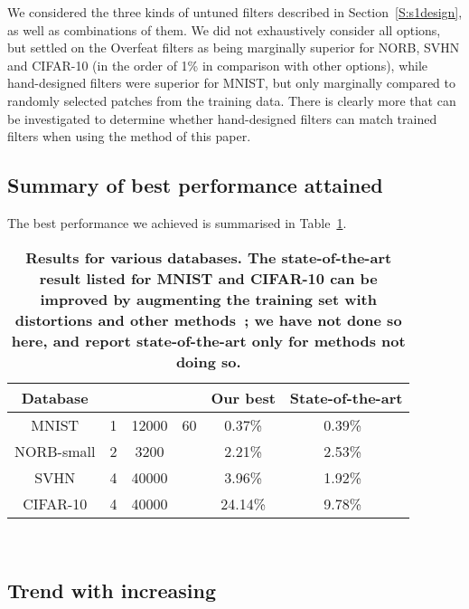 \documentclass[conference]{IEEEtran}
\begin{document}
We considered the three kinds of untuned filters described in Section~\ref{S:s1design}, as well as combinations of them. We did not exhaustively consider all options, but settled on the Overfeat filters as being marginally superior for NORB, SVHN and CIFAR-10 (in the order of 1\% in comparison with other options), while hand-designed filters were superior for MNIST, but only marginally compared to randomly selected patches from the training data. There is clearly more that can be investigated to determine whether hand-designed filters can match trained filters when using the method of this paper.

\subsection{Summary of best performance attained}

The best performance we achieved is summarised in Table~\ref{Table4}. 

\begin{table}[!ht]
{\footnotesize
\begin{tabular}{|c|c|c|c|c|c|}
\hline
Database  &  &  & & Our best & State-of-the-art\\
\hline
MNIST & 1& 12000  & 60 & 0.37\% & 0.39\%~\cite{Mairal.14,Lee.14}\\
NORB-small & 2&  3200 &  & 2.21\% & 2.53\%~\cite{Ciresan.11}\\
SVHN  &  4& 40000 &  & 3.96\%& 1.92\%~\cite{Lee.14}\\
CIFAR-10 &   4& 40000 &  & 24.14\% & 9.78\%~\cite{Lee.14}\\ 
\hline
\end{tabular}
~\\
\caption{\bf{Results for various databases. The state-of-the-art result listed for MNIST and CIFAR-10 can be improved by augmenting the training set with distortions and other methods~\cite{Simard.03,Ciresan.10,Ciresan.12}; we have not done so here, and report state-of-the-art only for methods not doing so.}}\label{Table4}
}
\end{table}

\subsection{Trend with increasing }
\end{document}
